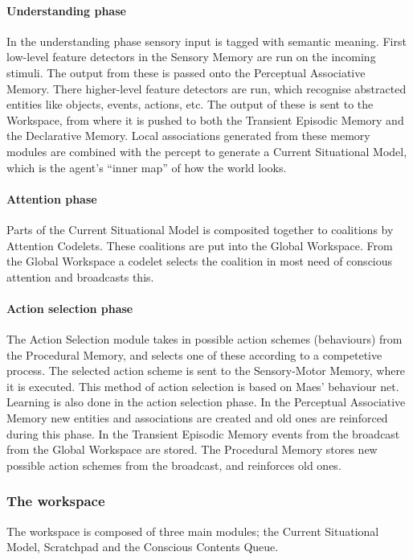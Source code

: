 \paragraph{Understanding phase}
In the understanding phase sensory input is tagged with semantic meaning. First low-level feature detectors in the Sensory Memory are run on the incoming stimuli. The output from these is passed onto the Perceptual Associative Memory. There higher-level feature detectors are run, which recognise abstracted entities like objects, events, actions, etc. The output of these is sent to the Workspace, from where it is pushed to both the Transient Episodic Memory and the Declarative Memory. Local associations generated from these memory modules are combined with the percept to generate a Current Situational Model, which is the agent's ``inner map'' of how the world looks.
\paragraph{Attention phase} Parts of the Current Situational Model is composited together to coalitions by Attention Codelets. These coalitions are put into the Global Workspace. From the Global Workspace a codelet selects the coalition in most need of conscious attention and broadcasts this.
\paragraph{Action selection phase} The Action Selection module takes in possible action schemes (behaviours) from the Procedural Memory, and selects one of these according to a competetive process. The selected action scheme is sent to the Sensory-Motor Memory, where it is executed. This method of action selection is based on Maes' behaviour net.\cite{maes1989right} Learning is also done in the action selection phase. In the Perceptual Associative Memory new entities and associations are created and old ones are reinforced during this phase. In the Transient Episodic Memory events from the broadcast from the Global Workspace are stored. The Procedural Memory stores new possible action schemes from the broadcast, and reinforces old ones.


\subsubsection{The workspace}
The workspace is composed of three main modules; the Current Situational Model, Scratchpad and the Conscious Contents Queue.

